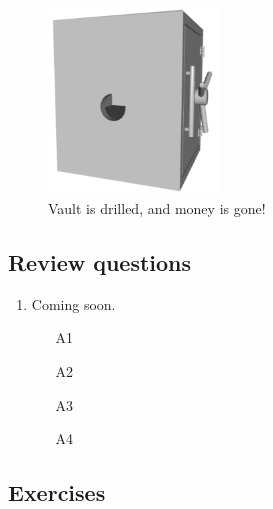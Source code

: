 \documentclass{article}
\begin{document}
\begin{figure}[!ht]
\begin{center}
\includegraphics[width=0.4\textwidth]{img/vault2.png}
\end{center}
\vspace{-2mm}
\caption{Vault is drilled, and money is gone!}
\label{fig:vault2}
\end{figure}
\noindent

\subsection{Review questions}

\begin{enumerate}
\item Coming soon.
\begin{itemize}
\item[A1]
\item[A2]
\item[A3]
\item[A4]
\end{itemize}
\end{enumerate}

\subsection{Exercises}
\end{document}
